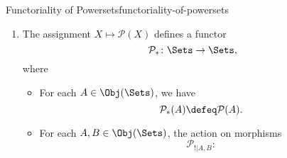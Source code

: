 \begin{proposition}{Functoriality of Powersets}{functoriality-of-powersets}
\begin{enumerate}
\[                \colon%
                \Sets^{\op}%
                \to%
                \Sets,%
            \]%
            where
            \begin{itemize}
                \item{}For each $A\in\Obj(\Sets)$, we have
                    \[
                        \mathcal{P}^{-1}(A)%
                        \defeq%
                        \mathcal{P}(A).%
                    \]%
                \item{}For each $A,B\in\Obj(\Sets)$, the action on morphisms
                    \[
                        \mathcal{P}^{-1}_{A,B}%
                        \colon%
                        \Sets(A,B)%
                        \to%
                        \Sets(\mathcal{P}(B),\mathcal{P}(A))%
                    \]%
                    of $\mathcal{P}^{-1}$ at $(A,B)$ is the map defined by by sending a map of sets $f\colon A\to B$ to the map
                    \[
                        \mathcal{P}^{-1}(f)%
                        \colon%
                        \mathcal{P}(B)%
                        \to%
                        \mathcal{P}(A)%
                    \]%
                    defined by
                    \[
                        \mathcal{P}^{-1}(f)%
                        \defeq%
                        f^{-1},%
                    \]%
                    as in \cref{the-inverse-image-function-associated-to-a-function}.
            \end{itemize}
        \item\label{functoriality-of-powersets-functoriality-3}The assignment $X\mapsto\mathcal{P}(X)$ defines a functor
            \[
                \mathcal{P}_{*}%
                \colon%
                \Sets%
                \to%
                \Sets,%
            \]%
            where
            \begin{itemize}
                \item{}For each $A\in\Obj(\Sets)$, we have
                    \[
                        \mathcal{P}_{*}(A)%
                        \defeq%
                        \mathcal{P}(A).%
                    \]%
                \item{}For each $A,B\in\Obj(\Sets)$, the action on morphisms
                    \[
                        \mathcal{P}_{!|A,B}%
                        \colon%
\]
\end{itemize}
\end{enumerate}
\end{proposition}

